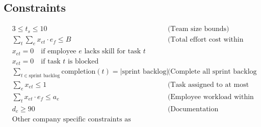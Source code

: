 \documentclass{article}
\begin{document}
\subsection*{Constraints}

\begin{align}
& 3 \leq t_s \leq 10 \quad && \text{(Team size bounds)} \\
& \sum_{t} \sum_{e} x_{et} \cdot e_f \leq B \quad && \text{(Total effort cost within budget)} \\
& x_{et} = 0 \quad \text{if employee $e$ lacks skill for task $t$} \\
& x_{et} = 0 \quad \text{if task $t$ is blocked} \\
& \sum_{t \in \text{sprint backlog}} \text{completion}(t) = |\text{sprint backlog}| \quad && \text{(Complete all sprint backlog tasks)} \\
& \sum_{e} x_{et} \leq 1 \quad && \text{(Task assigned to at most one employee)} \\
& \sum_{t} x_{et} \cdot e_f \leq a_e \quad && \text{(Employee workload within availability)} \\
& d_c \geq 90 \quad && \text{(Documentation completeness at least 90\%)} \\
& \text{Other company specific constraints as required} \nonumber
\end{align}
\end{document}
